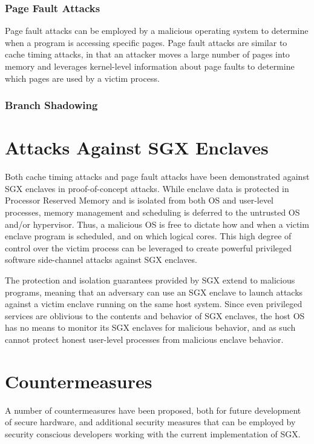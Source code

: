 \subsubsection{Page Fault Attacks}

Page fault attacks can be employed by a malicious operating system to determine when a program is accessing specific pages. Page fault attacks are similar to cache timing attacks, in that an attacker moves a large number of pages into memory and leverages kernel-level information about page faults to determine which pages are used by a victim process.

\subsubsection{Branch Shadowing}

\section{Attacks Against SGX Enclaves}

Both cache timing attacks and page fault attacks have been demonstrated against SGX enclaves in proof-of-concept attacks. While enclave data is protected in Processor Reserved Memory and is isolated from both OS and user-level processes, memory management and scheduling is deferred to the untrusted OS and/or hypervisor. Thus, a malicious OS is free to dictate how and when a victim enclave program is scheduled, and on which logical cores. This high degree of control over the victim process can be leveraged to create powerful privileged software side-channel attacks against SGX enclaves.  

The protection and isolation guarantees provided by SGX extend to malicious programs, meaning that an adversary can use an SGX enclave to launch attacks against a victim enclave running on the same host system. Since even privileged services are oblivious to the contents and behavior of SGX enclaves, the host OS has no means to monitor its SGX enclaves for malicious behavior, and as such cannot protect honest user-level processes from malicious enclave behavior.

\section{Countermeasures}

A number of countermeasures have been proposed, both for future development of secure hardware, and additional security measures that can be employed by security conscious developers working with the current implementation of SGX.

